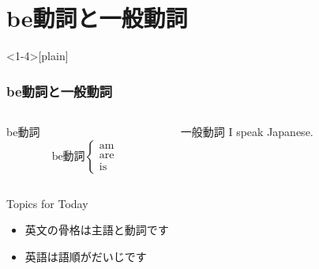 \documentclass[aspectratio=169]{beamer}
\begin{document}
\section{be動詞と一般動詞}
\begin{frame}<1-4>[plain]\frametitle{be動詞と一般動詞}

\begin{columns}
\begin{column}[t]{.45\textwidth}
\begin{block}{be動詞}
{\Large
\[
\text{be動詞}
\begin{cases}
\text{am} \\
\text{are}\\
\text{is}
\end{cases}
\]
}
\end{block}
\end{column}
\pause
\begin{column}[t]{.45\textwidth}
\begin{block}{一般動詞}
I speak Japanese.
\end{block}
\end{column}
\end{columns}


\bigskip
\pause
\begin{exampleblock}{Topics for Today}
\begin{itemize}
 \item   英文の骨格は主語と動詞です
 \item   英語は語順がだいじです
\end{itemize}
     \end{exampleblock}

\end{frame}
\end{document}
